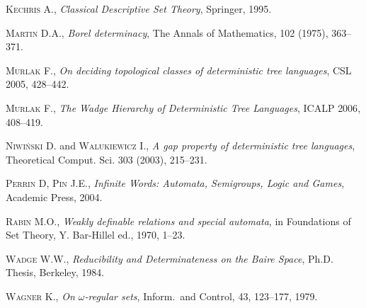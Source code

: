\begin{thebibliography}{00}
{
\textsc{Kechris} A., \emph{Classical Descriptive Set Theory}, Springer, \textsc{1995}.


\textsc{Martin} D.A., \emph{Borel determinacy}, The Annals of Mathematics, \textsc{102} (1975), 363--371.


\textsc{Murlak} F., \emph{On deciding topological classes of deterministic tree languages}, CSL \textsc{2005}, 428--442. 

\textsc{Murlak} F., \emph{The Wadge Hierarchy of Deterministic Tree Languages}, ICALP \textsc{2006}, 408--419. 

\textsc{Niwiński} D. and \textsc{Walukiewicz} I., \emph{A gap property of deterministic tree languages}, Theoretical Comput. Sci. \textsc{303} (2003), 215--231.



\textsc{Perrin} D, \textsc{Pin} J.E., \emph{Infinite Words: Automata, Semigroups, Logic and Games}, Academic Press, \textsc{2004}.

\textsc{Rabin} M.O., \emph{Weakly definable relations and special automata}, in Foundations of Set Theory, Y. Bar-Hillel ed., \textsc{1970}, 1--23.

\textsc{Wadge} W.W., \emph{Reducibility and Determinateness on the Baire Space}, Ph.D. Thesis, Berkeley, \textsc{1984}.

\textsc{Wagner} K., \emph{On $\omega$-regular sets}, Inform.~and Control, \textsc{43}, 123--177, 1979. }

\end{thebibliography}
